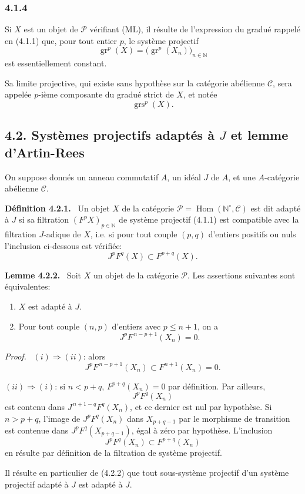 \documentclass[11pt]{article}
\newenvironment{statement}[1]{\par\medskip\noindent\textbf{#1.}\ }{\par\medskip}
\newenvironment{prooftext}[1][Proof]{\par\noindent\emph{#1.}\ }{\par\medskip}
\DeclareMathOperator{\Hom}{Hom}
\providecommand{\gr}{\operatorname{gr}}
\providecommand{\Hom}{\operatorname{Hom}}
\providecommand{\gr}{\operatorname{gr}}
\providecommand{\gr}{\operatorname{gr}}
\providecommand{\grs}{\operatorname{grs}}
\providecommand{\Hom}{\operatorname{Hom}}
\begin{document}
\subsubsection*{4.1.4}
Si $X$ est un objet de \(\mathcal P\) vérifiant (ML), il résulte de l'expression du gradué rappelé en (4.1.1) que, pour tout entier \(p\), le système projectif
\[
\gr^p(X)=\bigl(\gr^p(X_n)\bigr)_{n\in\mathbb N}
\]
est essentiellement constant.

Sa limite projective, qui existe sans hypothèse sur la catégorie abélienne \(\mathcal C\), sera appelée \(p\)-ième composante du gradué strict de \(X\), et notée
\[
\grs^p(X).
\]

\subsection*{4.2. Systèmes projectifs adaptés à \(J\) et lemme d'Artin-Rees}

On suppose donnés un anneau commutatif \(A\), un idéal \(J\) de \(A\), et une \(A\)-catégorie abélienne \(\mathcal C\).

\begin{statement}{Définition 4.2.1}
Un objet \(X\) de la catégorie \(\mathcal P=\Hom(\mathbb N^\circ,\mathcal C)\) est dit adapté à \(J\) si sa filtration \((F^pX)_{p\in\mathbb N}\) de système projectif (4.1.1) est compatible avec la filtration \(J\)-adique de \(X\), i.e. si pour tout couple \((p,q)\) d'entiers positifs ou nuls l'inclusion ci-dessous est vérifiée:
\[
J^pF^q(X)\subset F^{p+q}(X).
\]
\end{statement}

\begin{statement}{Lemme 4.2.2}
Soit \(X\) un objet de la catégorie \(\mathcal P\). Les assertions suivantes sont équivalentes:
\begin{enumerate}[label=\textup{(\roman*)}]
\item \(X\) est adapté à \(J\).
\item Pour tout couple \((n,p)\) d'entiers avec \(p\le n+1\), on a
\[
J^pF^{\,n-p+1}(X_n)=0 .
\]
\end{enumerate}
\end{statement}

\begin{prooftext}
\((i)\Rightarrow(ii)\): alors
\[
J^pF^{\,n-p+1}(X_n)\subset F^{n+1}(X_n)=0.
\]

\((ii)\Rightarrow(i)\): si \(n<p+q\), \(F^{p+q}(X_n)=0\) par définition. Par ailleurs,
\[
J^pF^q(X_n)
\]
est contenu dans \(J^{\,n+1-q}F^q(X_n)\), et ce dernier est nul par hypothèse. Si \(n>p+q\), l'image de \(J^pF^q(X_n)\) dans \(X_{p+q-1}\) par le morphisme de transition est contenue dans \(J^pF^q(X_{p+q-1})\), égal à zéro par hypothèse. L'inclusion
\[
J^pF^q(X_n)\subset F^{p+q}(X_n)
\]
en résulte par définition de la filtration de système projectif.

Il résulte en particulier de (4.2.2) que tout sous-système projectif d'un système projectif adapté à \(J\) est adapté à \(J\).
\end{prooftext}
\end{document}

